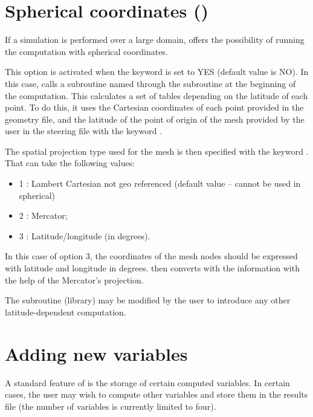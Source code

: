 \section{Spherical coordinates ()}

If a simulation is performed over a large domain,  offers the
possibility of running the computation with spherical coordinates.

This option is activated when the keyword  is set
to YES (default value is NO). In this case,  calls a subroutine named
 through the subroutine  at the beginning of the computation. This
calculates a set of tables depending on the latitude of each point. To do this,
it uses the Cartesian coordinates of each point provided in the geometry file,
and the latitude of the point of origin of the mesh provided by the user in the
steering file with the keyword .

The spatial projection type used for the mesh is then specified with the
keyword . That can take the following values:
\begin{itemize}
\item 1 : Lambert Cartesian not geo referenced (default value -- cannot be used
in spherical)

\item 2 : Mercator;

\item 3 : Latitude/longitude (in degrees).
\end{itemize}

In this case of option 3, the coordinates of the mesh nodes should be
expressed with latitude and longitude in degrees.  then converts with
the information with the help of the Mercator's projection.

The  subroutine (\bief library) may be modified by the user to introduce
any other latitude-dependent computation.


\section{Adding new variables}
\label{sec:privarray}
A standard feature of  is the storage of certain computed variables.
In certain cases, the user may wish to compute other variables and store them
in the results file (the number of variables is currently limited to four).

